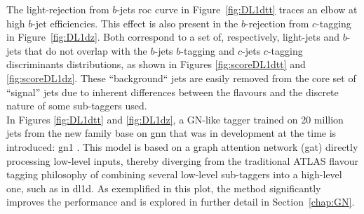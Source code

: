 The light-rejection from $b$-jets \gls{roc} curve in Figure~\ref{fig:DL1dtt} traces an elbow at high $b$-jet efficiencies. This effect is also present in the $b$-rejection from $c$-tagging in Figure~\ref{fig:DL1dz}. Both correspond to a set of, respectively, light-jets and $b$-jets that do not overlap with the $b$-jets $b$-tagging and $c$-jets $c$-tagging discriminants distributions, as shown in Figures \ref{fig:scoreDL1dtt} and \ref{fig:scoreDL1dz}. These ``background`` jets are easily removed from the core set of ``signal'' jets due to inherent differences between the flavours and the discrete nature of some sub-taggers used. \\

In Figures \ref{fig:DL1dtt} and \ref{fig:DL1dz}, a GN-like tagger trained on 20 million jets from the new family base on \gls{gnn} that was in development at the time is introduced: \gls{gn1} \cite{ATL-PHYS-PUB-2022-027}. This model is based on a graph attention network (\gls{gat}) directly processing low-level inputs, thereby diverging from the traditional ATLAS flavour tagging philosophy of combining several low-level sub-taggers into a high-level one, such as in \gls{dl1d}. As exemplified in this plot, the method significantly improves the performance and is explored in further detail in Section~\ref{chap:GN}. \\

